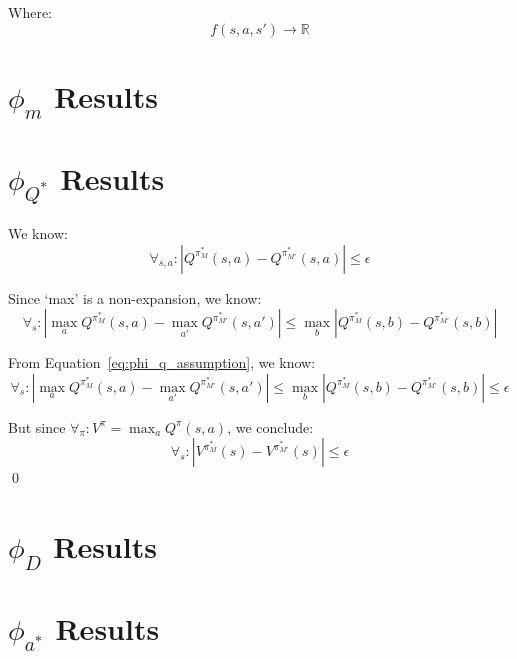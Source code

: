 \documentclass[11pt]{amsart}
\begin{document}
Where:
\begin{equation}
f(s,a,s') \rightarrow \mathbb{R}
\end{equation}


\newpage
\section{$\phi_{m}$ Results}


\newpage
\section{$\phi_{Q^*}$ Results}

We know:
\begin{equation}
\forall_{s,a} : | Q^{\pi^*_M}(s,a) - Q^{\pi^*_{M'}}(s,a)| \leq \epsilon
\label{eq:phi_q_assumption}
\end{equation}

Since `max' is a non-expansion, we know:
\begin{equation}
\forall_s : |\max_a Q^{\pi^*_M}(s,a) - \max_{a'} Q^{\pi^*_{M'}}(s,a')| \leq \max_b | Q^{\pi^*_M}(s,b) - Q^{\pi^*_{M'}}(s,b)|
\end{equation}

From Equation~\ref{eq:phi_q_assumption}, we know:
\begin{equation}
\forall_s : |\max_a Q^{\pi^*_M}(s,a) - \max_{a'} Q^{\pi^*_{M'}}(s,a')| \leq \max_b | Q^{\pi^*_M}(s,b) - Q^{\pi^*_{M'}}(s,b)| \leq \epsilon
\end{equation}

But since $\forall_\pi : V^{\pi} = \max_a Q^\pi(s,a)$, we conclude:
\begin{equation}
\forall_s : |V^{\pi^*_M}(s) - V^{\pi^*_{M'}}(s)| \leq \epsilon
\end{equation}
\qed

\newpage
\section{$\phi_{D}$ Results}

\newpage
\section{$\phi_{a^*}$ Results}



\newpage

\end{document}
